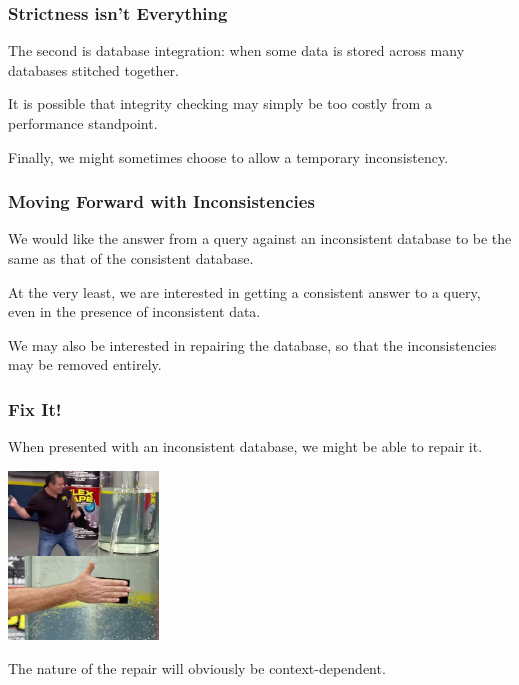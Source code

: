 \begin{frame}
\frametitle{Strictness isn't Everything}

The second is database integration: when some data is stored across many databases stitched together.

It is possible that integrity checking may simply be too costly from a performance standpoint.

Finally, we might sometimes choose to allow a temporary inconsistency.

\end{frame}


\begin{frame}
\frametitle{Moving Forward with Inconsistencies}

We would like the answer from a query against an inconsistent database to be the same as that of the consistent database. 

At the very least, we are interested in getting a consistent answer to a query, even in the presence of inconsistent data. 

We may also be interested in repairing the database, so that the inconsistencies may be removed entirely.

\end{frame}


\begin{frame}
\frametitle{Fix It!}

When presented with an inconsistent database, we might be able to repair it. 

\begin{center}
	\includegraphics[width=0.3\textwidth]{images/flextape.png}
\end{center}

The nature of the repair will obviously be context-dependent. 

\end{frame}

